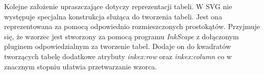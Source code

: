 \documentclass[11pt,a4paper]{article}
\begin{document}
Kolejne założenie upraszczające dotyczy reprezentacji tabeli. W SVG nie występuje specjalna konstrukcja służąca do tworzenia tabeli. Jest ona reprezentowana za pomocą odpowiednio rozmieszczonych prostokątów. Przyjmuje się, że wzorzec jest stworzony za pomocą programu \emph{InkScape} z dołączonym pluginem odpowiedzialnym za tworzenie tabel. Dodaje on do kwadratów tworzących tabelę dodatkowe atrybuty \emph{inkex:row} oraz \emph{inkex:column} co w znacznym stopniu ułatwia przetwarzanie wzorca.
\end{document}
